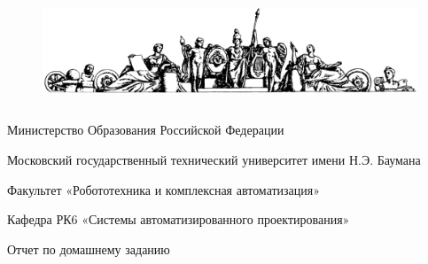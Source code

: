 
\begin{figure}[H]
	\begin{center}
		\includegraphics[width=5.59in,height=1.3in]{./img/titul.png}
	\end{center}
\end{figure}



\begin{center}
{\fontsize{14pt}{16.8pt}\selectfont Министерство Образования Российской Федерации\par}
\end{center}\par

\begin{center}
{\fontsize{14pt}{16.8pt}\selectfont Московский государственный технический университет имени Н.Э. Баумана\par}
\end{center}\par


\vskip 1cm
\begin{center}
{\fontsize{14pt}{16.8pt}\selectfont Факультет «Робототехника и комплексная автоматизация»\par}
\end{center}\par

\begin{center}
{\fontsize{14pt}{16.8pt}\selectfont Кафедра РК6 «Системы автоматизированного проектирования»\par}
\end{center}\par


\vspace{\baselineskip}

\vspace{\baselineskip}
\begin{center}
{\fontsize{14pt}{16.8pt}\selectfont Отчет по домашнему заданию \par}
\end{center}\par

